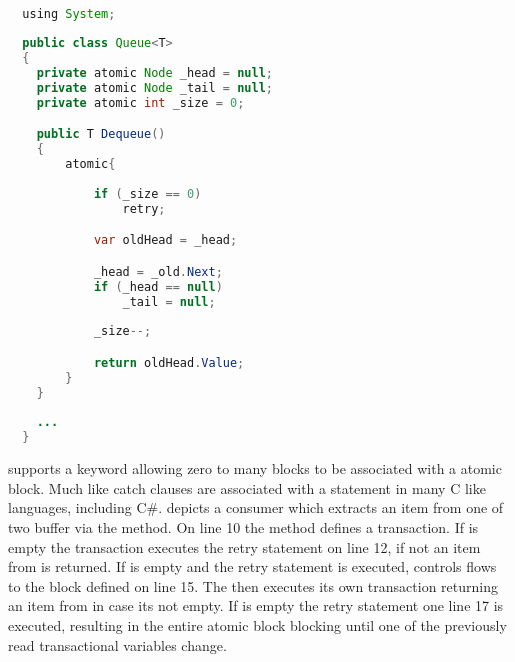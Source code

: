 \begin{lstlisting}[label=lst:stm_atomic_syntax_retry,
  caption={Retry Syntax},
  language=Java,  
  showspaces=false,
  showtabs=false,
  breaklines=true,
  showstringspaces=false,
  breakatwhitespace=true,
  commentstyle=\color{greencomments},
  keywordstyle=\color{bluekeywords},
  stringstyle=\color{redstrings},
  morekeywords={atomic, retry, orElse, var, get, set, using}]  % Start your code-block

  using System;
  
  public class Queue<T>
  {
  	private atomic Node _head = null;
  	private atomic Node _tail = null;
  	private atomic int _size = 0;

  	public T Dequeue()
  	{
  		atomic{
  		
  			if (_size == 0)
  				retry;

  			var oldHead = _head;

  			_head = _old.Next;
  			if (_head == null)
  				_tail = null;
  			
  			_size--;

  			return oldHead.Value;
  		}
  	}
  	
  	...
  }
\end{lstlisting}

\stmnamesp supports a  keyword allowing zero to many  blocks to be associated with a atomic block. Much like catch clauses are associated with a  statement in many C like languages, including C\#\cite[p. 96]{sestoft2011c}.  depicts a consumer which extracts an item from one of two buffer via the  method. On line 10 the  method defines a transaction. If  is empty the transaction executes the retry statement on line 12, if not an item from  is returned. If  is empty and the retry statement is executed, controls flows to the  block defined on line 15. The  then executes its own transaction returning an item from  in case its not empty. If  is empty the retry statement one line 17 is executed, resulting in the entire atomic block blocking until one of the previously read transactional variables change.

